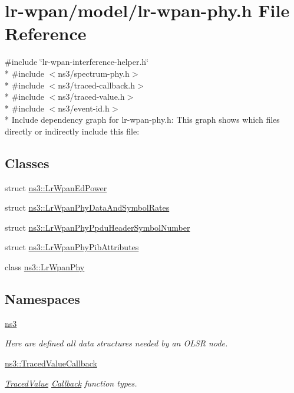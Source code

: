 \hypertarget{lr-wpan-phy_8h}{}\section{lr-\/wpan/model/lr-\/wpan-\/phy.h File Reference}
\label{lr-wpan-phy_8h}
{\ttfamily \#include \char`\"{}lr-\/wpan-\/interference-\/helper.\+h\char`\"{}}\\*
{\ttfamily \#include $<$ns3/spectrum-\/phy.\+h$>$}\\*
{\ttfamily \#include $<$ns3/traced-\/callback.\+h$>$}\\*
{\ttfamily \#include $<$ns3/traced-\/value.\+h$>$}\\*
{\ttfamily \#include $<$ns3/event-\/id.\+h$>$}\\*
Include dependency graph for lr-\/wpan-\/phy.h\+:
This graph shows which files directly or indirectly include this file\+:
\subsection*{Classes}
\begin{DoxyCompactItemize}
\item 
struct \hyperlink{structns3_1_1LrWpanEdPower}{ns3\+::\+Lr\+Wpan\+Ed\+Power}
\item 
struct \hyperlink{structns3_1_1LrWpanPhyDataAndSymbolRates}{ns3\+::\+Lr\+Wpan\+Phy\+Data\+And\+Symbol\+Rates}
\item 
struct \hyperlink{structns3_1_1LrWpanPhyPpduHeaderSymbolNumber}{ns3\+::\+Lr\+Wpan\+Phy\+Ppdu\+Header\+Symbol\+Number}
\item 
struct \hyperlink{structns3_1_1LrWpanPhyPibAttributes}{ns3\+::\+Lr\+Wpan\+Phy\+Pib\+Attributes}
\item 
class \hyperlink{classns3_1_1LrWpanPhy}{ns3\+::\+Lr\+Wpan\+Phy}
\end{DoxyCompactItemize}
\subsection*{Namespaces}
\begin{DoxyCompactItemize}
\item 
 \hyperlink{namespacens3}{ns3}
\begin{DoxyCompactList}\small\item\em Here are defined all data structures needed by an O\+L\+SR node. \end{DoxyCompactList}\item 
 \hyperlink{namespacens3_1_1TracedValueCallback}{ns3\+::\+Traced\+Value\+Callback}
\begin{DoxyCompactList}\small\item\em \hyperlink{classns3_1_1TracedValue}{Traced\+Value} \hyperlink{classns3_1_1Callback}{Callback} function types. \end{DoxyCompactList}\end{DoxyCompactItemize}
